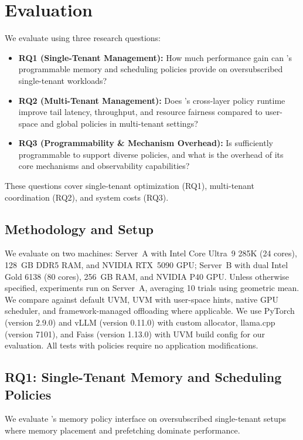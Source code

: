 \section{Evaluation}
\label{sec:eval}

We evaluate \sys using three research questions:

\begin{itemize}[leftmargin=*]
  \item \textbf{RQ1 (Single-Tenant Management):} How much performance gain can \sys's programmable memory and scheduling policies provide on oversubscribed single-tenant workloads?
  \item \textbf{RQ2 (Multi-Tenant Management):} Does \sys's cross-layer policy runtime improve tail latency, throughput, and resource fairness compared to user-space and global policies in multi-tenant settings?
  \item \textbf{RQ3 (Programmability \& Mechanism Overhead):} Is \sys sufficiently programmable to support diverse policies, and what is the overhead of its core mechanisms and observability capabilities?
\end{itemize}

These questions cover single-tenant optimization (RQ1), multi-tenant coordination (RQ2), and system costs (RQ3).

\subsection{Methodology and Setup}

We evaluate \sys on two machines: Server~A with Intel Core Ultra~9 285K (24 cores), 128~GB DDR5 RAM, and NVIDIA RTX~5090 GPU; Server~B with dual Intel Gold 6138 (80 cores), 256~GB RAM, and NVIDIA P40 GPU. Unless otherwise specified, experiments run on Server~A, averaging 10 trials using geometric mean. We compare against default UVM, UVM with user-space hints, native GPU scheduler, and framework-managed offloading where applicable. We use PyTorch (version 2.9.0) and vLLM (version 0.11.0) with custom allocator, llama.cpp (version 7101), and Faiss (version 1.13.0) with UVM build config for our evaluation. All tests with \sys policies require no application modifications.


\subsection{RQ1: Single-Tenant Memory and Scheduling Policies}

We evaluate \sys's memory policy interface on oversubscribed single-tenant setups where memory placement and prefetching dominate performance.

